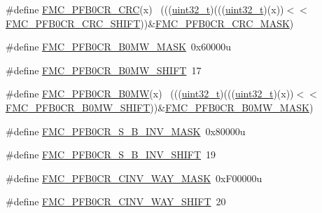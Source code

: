 \begin{DoxyCompactItemize}
\item 
\#define \hyperlink{group___f_m_c___register___masks_ga8afa628555e68cad80bdb5cec8f46a27}{F\+M\+C\+\_\+\+P\+F\+B0\+C\+R\+\_\+\+C\+RC}(x)                                            ~(((\hyperlink{_p_e___types_8h_a33594304e786b158f3fb30289278f5af}{uint32\+\_\+t})(((\hyperlink{_p_e___types_8h_a33594304e786b158f3fb30289278f5af}{uint32\+\_\+t})(x))$<$$<$\hyperlink{group___f_m_c___register___masks_ga45e4e9c3fff1241f2d1fffa05825efc8}{F\+M\+C\+\_\+\+P\+F\+B0\+C\+R\+\_\+\+C\+R\+C\+\_\+\+S\+H\+I\+FT}))\&\hyperlink{group___f_m_c___register___masks_ga2ba15c609c4ff7e43ed4d6119b704ddd}{F\+M\+C\+\_\+\+P\+F\+B0\+C\+R\+\_\+\+C\+R\+C\+\_\+\+M\+A\+SK})
\item 
\#define \hyperlink{group___f_m_c___register___masks_gac03a4c507c37a0a18312d87c64e1ec5d}{F\+M\+C\+\_\+\+P\+F\+B0\+C\+R\+\_\+\+B0\+M\+W\+\_\+\+M\+A\+SK}~0x60000u
\item 
\#define \hyperlink{group___f_m_c___register___masks_gacfb3dd701c01e307d578e1fd0d048149}{F\+M\+C\+\_\+\+P\+F\+B0\+C\+R\+\_\+\+B0\+M\+W\+\_\+\+S\+H\+I\+FT}~17
\item 
\#define \hyperlink{group___f_m_c___register___masks_ga155841881308b676667566bc8d9be324}{F\+M\+C\+\_\+\+P\+F\+B0\+C\+R\+\_\+\+B0\+MW}(x)                                          ~(((\hyperlink{_p_e___types_8h_a33594304e786b158f3fb30289278f5af}{uint32\+\_\+t})(((\hyperlink{_p_e___types_8h_a33594304e786b158f3fb30289278f5af}{uint32\+\_\+t})(x))$<$$<$\hyperlink{group___f_m_c___register___masks_gacfb3dd701c01e307d578e1fd0d048149}{F\+M\+C\+\_\+\+P\+F\+B0\+C\+R\+\_\+\+B0\+M\+W\+\_\+\+S\+H\+I\+FT}))\&\hyperlink{group___f_m_c___register___masks_gac03a4c507c37a0a18312d87c64e1ec5d}{F\+M\+C\+\_\+\+P\+F\+B0\+C\+R\+\_\+\+B0\+M\+W\+\_\+\+M\+A\+SK})
\item 
\#define \hyperlink{group___f_m_c___register___masks_ga74a064f6c3eaf054162fde2404485904}{F\+M\+C\+\_\+\+P\+F\+B0\+C\+R\+\_\+\+S\+\_\+\+B\+\_\+\+I\+N\+V\+\_\+\+M\+A\+SK}~0x80000u
\item 
\#define \hyperlink{group___f_m_c___register___masks_gaa086ecdb24a1217c39116b73aca5ac4f}{F\+M\+C\+\_\+\+P\+F\+B0\+C\+R\+\_\+\+S\+\_\+\+B\+\_\+\+I\+N\+V\+\_\+\+S\+H\+I\+FT}~19
\item 
\#define \hyperlink{group___f_m_c___register___masks_gad64b080bc4174e9af7d04246befca017}{F\+M\+C\+\_\+\+P\+F\+B0\+C\+R\+\_\+\+C\+I\+N\+V\+\_\+\+W\+A\+Y\+\_\+\+M\+A\+SK}~0x\+F00000u
\item 
\#define \hyperlink{group___f_m_c___register___masks_ga987dfe8d13ee805246f048943fcb9ee5}{F\+M\+C\+\_\+\+P\+F\+B0\+C\+R\+\_\+\+C\+I\+N\+V\+\_\+\+W\+A\+Y\+\_\+\+S\+H\+I\+FT}~20

\end{DoxyCompactItemize}
